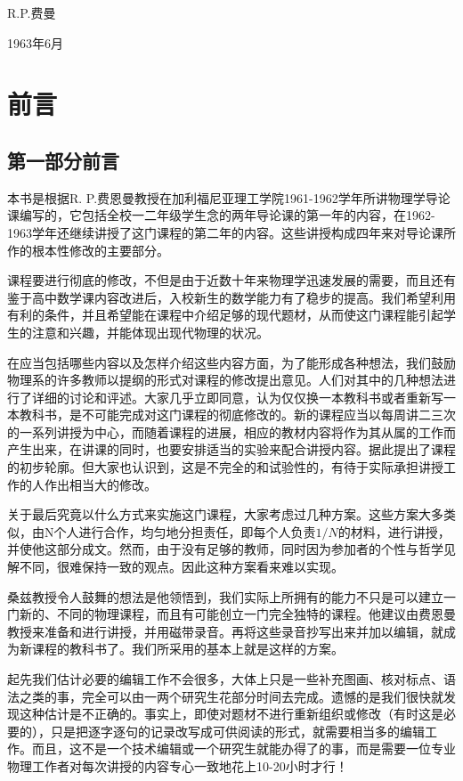 \documentclass[UTF8, 12pt, a4paper, twoside]{ctexbook}
\begin{document}
\hfill R.P.费曼

\hfill 1963年6月

\chapter*{前言}

\section*{第一部分前言}

本书是根据R. P.费恩曼教授在加利福尼亚理工学院1961-1962学年所讲物理学导论课编写的，它包括全校一二年级学生念的两年导论课的第一年的内容，在1962-1963学年还继续讲授了这门课程的第二年的内容。这些讲授构成四年来对导论课所作的根本性修改的主要部分。
  
课程要进行彻底的修改，不但是由于近数十年来物理学迅速发展的需要，而且还有鉴于高中数学课内容改进后，入校新生的数学能力有了稳步的提高。我们希望利用有利的条件，并且希望能在课程中介绍足够的现代题材，从而使这门课程能引起学生的注意和兴趣，并能体现出现代物理的状况。
  
在应当包括哪些内容以及怎样介绍这些内容方面，为了能形成各种想法，我们鼓励物理系的许多教师以提纲的形式对课程的修改提出意见。人们对其中的几种想法进行了详细的讨论和评述。大家几乎立即同意，认为仅仅换一本教科书或者重新写一本教科书，是不可能完成对这门课程的彻底修改的。新的课程应当以每周讲二三次的一系列讲授为中心，而随着课程的进展，相应的教材内容将作为其从属的工作而产生出来，在讲课的同时，也要安排适当的实验来配合讲授内容。据此提出了课程的初步轮廓。但大家也认识到，这是不完全的和试验性的，有待于实际承担讲授工作的人作出相当大的修改。
  
关于最后究竟以什么方式来实施这门课程，大家考虑过几种方案。这些方案大多类似，由N个人进行合作，均匀地分担责任，即每个人负责$1/N$的材料，进行讲授，并使他这部分成文。然而，由于没有足够的教师，同时因为参加者的个性与哲学见解不同，很难保持一致的观点。因此这种方案看来难以实现。
  
桑兹教授令人鼓舞的想法是他领悟到，我们实际上所拥有的能力不只是可以建立一门新的、不同的物理课程，而且有可能创立一门完全独特的课程。他建议由费恩曼教授来准备和进行讲授，并用磁带录音。再将这些录音抄写出来并加以编辑，就成为新课程的教科书了。我们所采用的基本上就是这样的方案。
  
起先我们估计必要的编辑工作不会很多，大体上只是一些补充图画、核对标点、语法之类的事，完全可以由一两个研究生花部分时间去完成。遗憾的是我们很快就发现这种估计是不正确的。事实上，即使对题材不进行重新组织或修改（有时这是必要的），只是把逐字逐句的记录改写成可供阅读的形式，就需要相当多的编辑工作。而且，这不是一个技术编辑或一个研究生就能办得了的事，而是需要一位专业物理工作者对每次讲授的内容专心一致地花上10-20小时才行！
  
\end{document}
